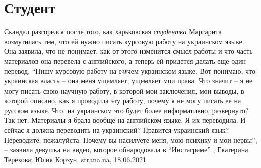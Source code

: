  
 
 
 
 
\chapter{Студент}

Скандал разгорелся после того, как харьковская \emph{студентка} Маргарита возмутилась
тем, что ей нужно писать курсовую работу на украинском языке.  Она заявила, что
не понимает, как от этого изменится смысл работы и что часть материалов она
перевела с английского, а теперь ей придется делать еще один перевод.  \enquote{Пишу
курсовую работу на е@чем украинском языке. Вот понимаю, что украинская власть –
она меня ущемляет, ущемляет мои права. Что значит – я не могу писать свою
научную работу, в которой мои заключения, мои выводы, в которой описано, как я
проводила эту работу, почему я не могу писать ее на русском языке. Что, на
украинском это будет более информативно, развернуто? Так нет.  Материалы я
брала вообще на английском языке. Я их переводила. И сейчас я должна переводить
на украинский? Нравится украинский язык? Переводите, пожалуйста. Почему вы
насилуете меня, мою психику и мои нервы}, – заявила девушка на видео, которое
обнародовала в \enquote{Инстаграме}
, 
Екатерина Терехова; Юлия Корзун, strana.ua, 18.06.2021

